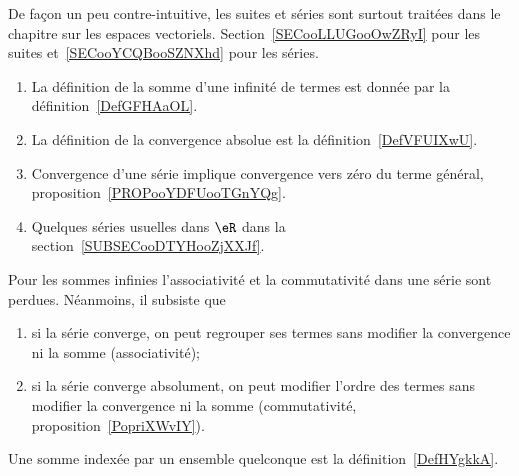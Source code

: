 
De façon un peu contre-intuitive, les suites et séries sont surtout traitées dans le chapitre sur les espaces vectoriels. Section~\ref{SECooLLUGooOwZRyI} pour les suites et~\ref{SECooYCQBooSZNXhd} pour les séries.

\begin{enumerate}
    \item
        La définition de la somme d'une infinité de termes est donnée par la définition~\ref{DefGFHAaOL}.
    \item
        La définition de la convergence absolue est la définition~\ref{DefVFUIXwU}.
    \item
        Convergence d'une série implique convergence vers zéro du terme général, proposition~\ref{PROPooYDFUooTGnYQg}.
    \item
        Quelques séries usuelles dans \( \eR\) dans la section~\ref{SUBSECooDTYHooZjXXJf}.
\end{enumerate}

    Pour les sommes infinies l'associativité et la commutativité dans une série sont perdues. Néanmoins, il subsiste que
  \begin{enumerate}
  \item
      si la série converge, on peut regrouper ses termes sans modifier la convergence ni la somme (associativité);
  \item
      si la série converge absolument, on peut modifier l'ordre des termes sans modifier la convergence ni la somme (commutativité, proposition~\ref{PopriXWvIY}).
  \end{enumerate}

Une somme indexée par un ensemble quelconque est la définition~\ref{DefHYgkkA}.
